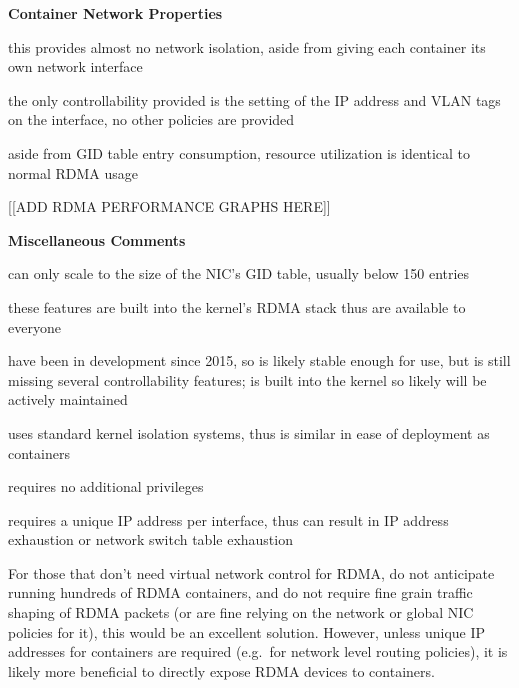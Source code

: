 \documentclass[12pt,titlepage]{article}
\begin{document}
\noindent
\textbf{Container Network Properties}
\begin{description}[nolistsep,font={{\scshape\bfseries}}]
   \item[Network Isolation] this provides almost no network isolation, aside from giving each container its own network interface
   \item[Controllability] the only controllability provided is the setting of the IP address and VLAN tags on the interface, no other policies are provided
   \item[Resource Utilization] aside from GID table entry consumption, resource utilization is identical to normal RDMA usage
\end{description}

[[ADD RDMA PERFORMANCE GRAPHS HERE]]

\noindent
\textbf{Miscellaneous Comments}
\begin{description}[nolistsep,font={{\scshape\bfseries}}]
   \item[Scalability Limits] can only scale to the size of the NIC's GID table, usually below 150 entries
   \item[Proprietary] these features are built into the kernel's RDMA stack thus are available to everyone
   \item[Maturity] have been in development since 2015, so is likely stable enough for use, but is still missing several controllability features; is built into the kernel so likely will be actively maintained
   \item[Ease in Deployment] uses standard kernel isolation systems, thus is similar in ease of deployment as containers
   \item[Execution Privileges] requires no additional privileges
   \item[Network Pressure] requires a unique IP address per interface, thus can result in IP address exhaustion or network switch table exhaustion
\end{description}

For those that don't need virtual network control for RDMA, do not anticipate running hundreds of RDMA containers, and do not require fine grain traffic shaping of RDMA packets (or are fine relying on the network or global NIC policies for it), this would be an excellent solution.
However, unless unique IP addresses for containers are required (e.g.\ for network level routing policies), it is likely more beneficial to directly expose RDMA devices to containers.
\end{document}
